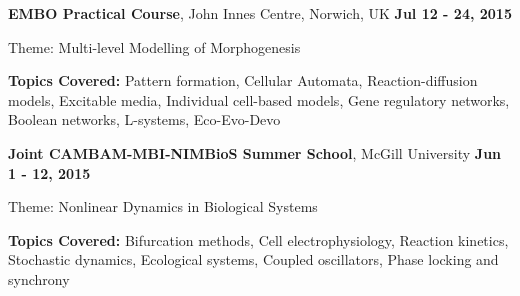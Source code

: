 \documentclass[margin,line]{res}
\newenvironment{list1}{
  \begin{list}{\ding{113}}{
      \setlength{\itemsep}{0in}
      \setlength{\parsep}{0in} \setlength{\parskip}{0in}
      \setlength{\topsep}{0in} \setlength{\partopsep}{0in}
      \setlength{\leftmargin}{0.17in}}}{\end{list}}
\begin{document}
\begin{resume}
{\bf EMBO Practical Course}, John Innes Centre, Norwich, UK  \hfill {\bf Jul 12 - 24, 2015}\\
\vspace*{-.2cm}
\begin{list1}
\item[] Theme: Multi-level Modelling of Morphogenesis
\vspace*{0.2cm}
\item[] {\bf Topics Covered:} Pattern formation, Cellular Automata, Reaction-diffusion models, Excitable media, Individual cell-based models, Gene regulatory networks, Boolean networks, L-systems, Eco-Evo-Devo
\end{list1}

{\bf Joint CAMBAM-MBI-NIMBioS Summer School}, McGill University \hfill {\bf Jun 1 - 12, 2015}\\
\vspace*{-.2cm}
\begin{list1}
\item[] Theme: Nonlinear Dynamics in Biological Systems
\vspace*{0.2cm}
\item[] {\bf Topics Covered:} Bifurcation methods, Cell electrophysiology, Reaction kinetics, Stochastic dynamics, Ecological systems, Coupled oscillators, Phase locking and synchrony
\end{list1}








\end{resume}
\end{document}
